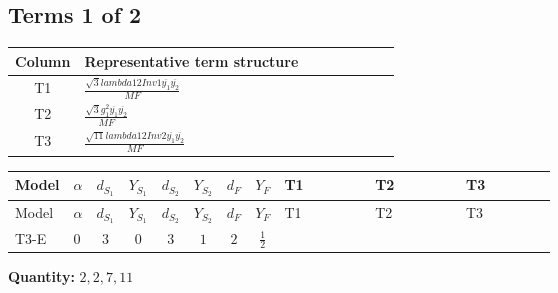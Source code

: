 \documentclass[8pt]{article}
\begin{document}
\begin{landscape}
\subsection*{Terms 1 of 2}
\begin{center}
\begin{tabular}{@{}c >{\raggedright\arraybackslash}p{0.82\linewidth}@{}}
\toprule
Column & Representative term structure \\
\midrule
T1 & \(\displaystyle \frac{\sqrt{3} lambda12Inv1 \overline{y_{1}} \overline{y_{2}}}{MF}\) \\
\midrule
T2 & \(\displaystyle \frac{\sqrt{3} g_{1}^{2} \overline{y_{1}} \overline{y_{2}}}{MF}\) \\
\midrule
T3 & \(\displaystyle \frac{\sqrt{11} lambda12Inv2 \overline{y_{1}} \overline{y_{2}}}{MF}\) \\
\midrule
\bottomrule
\end{tabular}
\end{center}
\smallskip
\tiny
\begin{longtable}{@{}llcccccc >{\raggedright\arraybackslash}p{0.21\linewidth} >{\raggedright\arraybackslash}p{0.21\linewidth} >{\raggedright\arraybackslash}p{0.21\linewidth}@{}}
\toprule
Model & $\alpha$ & $d_{S_1}$ & $Y_{S_1}$ & $d_{S_2}$ & $Y_{S_2}$ & $d_F$ & $Y_F$ & T1 & T2 & T3 \\
\midrule
\endfirsthead
\toprule
Model & $\alpha$ & $d_{S_1}$ & $Y_{S_1}$ & $d_{S_2}$ & $Y_{S_2}$ & $d_F$ & $Y_F$ & T1 & T2 & T3 \\
\midrule
\endhead
T3-E & $0$ & $3$ & $0$ & $3$ & $1$ & $2$ & $\frac{1}{2}$ & \scriptsize\adjustbox{max width=\linewidth}{$\begin{gathered} - \frac{\sqrt{3} lambda12Inv1 \overline{y_{1}} \overline{y_{2}}}{6 MF}\end{gathered}$} & \scriptsize\adjustbox{max width=\linewidth}{$\begin{gathered} \frac{\sqrt{3} g_{1}^{2} \overline{y_{1}} \overline{y_{2}}}{8 MF}\end{gathered}$} & \scriptsize\adjustbox{max width=\linewidth}{$\begin{gathered} \frac{3 \sqrt{11} lambda12Inv2 \overline{y_{1}} \overline{y_{2}}}{22 MF}\end{gathered}$} \\
\midrule
\bottomrule
\end{longtable}
\clearpage
\noindent\textbf{Quantity: }$\mathrm{2,2,7,11}$\par\smallskip

\end{landscape}
\end{document}
